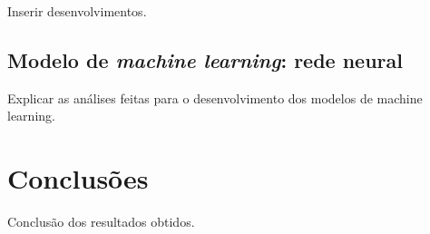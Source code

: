 \documentclass[a4paper,9pt,twocolumn,twoside,]{pinp}
\begin{document}
Inserir desenvolvimentos.

\hypertarget{modelo-de-machine-learning-rede-neural}{%
\subsection{\texorpdfstring{Modelo de \emph{machine learning}: rede
neural}{Modelo de machine learning: rede neural}}\label{modelo-de-machine-learning-rede-neural}}

Explicar as análises feitas para o desenvolvimento dos modelos de
machine learning.

\hypertarget{conclusuxf5es}{%
\section{Conclusões}\label{conclusuxf5es}}

Conclusão dos resultados obtidos.

\showacknow




\end{document}
